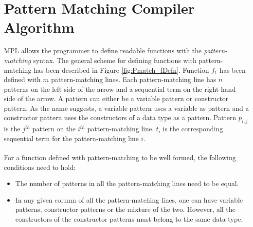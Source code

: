 \documentclass[11pt]{article}
\begin{document}
\section {Pattern Matching Compiler Algorithm}
MPL allows the programmer to define readable functions with the {\em pattern-matching} syntax. The general scheme for defining functions with pattern-matching has been described in Figure \ref {fig:Pmatch_fDefn}. Function $f_1$ has been defined with $m$ pattern-matching lines. Each pattern-matching line has $n$ patterns on the left side of the arrow and a sequential term on the right hand side of the arrow. A pattern can either be a variable pattern or constructor pattern. As the name suggests, a variable pattern uses a variable as pattern and a constructor pattern uses the constructors of a data type as a pattern. Pattern $p_{i,j}$ is the $j^{th}$ pattern on the $i^{th}$ pattern-matching line. $t_i$ is the corresponding sequential term for the pattern-matching line $i$. 
~~\\~~\\ 
For a function defined with pattern-matching to be well formed, the following conditions need to hold:
\begin{itemize}
  \item The number of patterns in all the pattern-matching lines need to be equal.
  \item In any given column of all the pattern-matching lines, one can have variable patterns, constructor patterns or the mixture of the two. However, all the constructors of the constructor patterns must belong to the same data type. 
\end{itemize}
\end{document}
